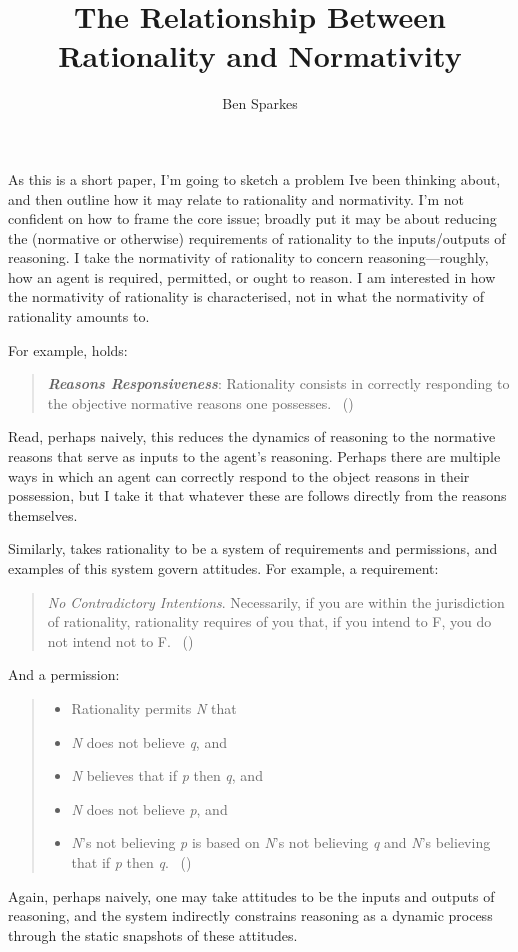 \documentclass[10pt]{article}
\title{The Relationship Between Rationality and Normativity}
\author{Ben Sparkes}
\begin{document}
\maketitle

As this is a short paper, I'm going to sketch a problem Ive been thinking about, and then outline how it may relate to rationality and normativity.
I'm not confident on how to frame the core issue; broadly put it may be about reducing the (normative or otherwise) requirements of rationality to the inputs/outputs of reasoning.
I take the normativity of rationality to concern reasoning---roughly, how an agent is required, permitted, or ought to reason.
I am interested in how the normativity of rationality is characterised, not in what the normativity of rationality amounts to.

For example, \citeauthor{Lord:2017aa} holds:
\begin{quote}
  \emph{\textbf{Reasons Responsiveness}}: Rationality consists in correctly responding to the objective normative reasons one possesses.\nolinebreak
  \mbox{ }\hfill(\citeyear[1121]{Lord:2017aa})
\end{quote}

Read, perhaps naively, this reduces the dynamics of reasoning to the normative reasons that serve as inputs to the agent's reasoning.
Perhaps there are multiple ways in which an agent can correctly respond to the object reasons in their possession, but I take it that whatever these are follows directly from the reasons themselves.

Similarly, \citeauthor{Broome:2013aa} takes rationality to be a system of requirements and permissions, and examples of this system govern attitudes.
For example, a requirement:
\begin{quote}
  \emph{No Contradictory Intentions}. Necessarily, if you are within the jurisdiction of rationality, rationality requires of you that, if you intend to F, you do not intend not to F.\nolinebreak
  \mbox{ }\hfill(\citeyear[136]{Broome:2013aa})
\end{quote}
And a permission:
\begin{quote}
  \begin{itemize}[label=]
  \item Rationality permits \emph{N} that
  \item \emph{N} does not believe \emph{q}, and
  \item \emph{N} believes that if \emph{p} then \emph{q}, and
  \item \emph{N} does not believe \emph{p}, and
  \item \emph{N}'s not believing \emph{p} is based on \emph{N}'s not believing \emph{q} and \emph{N}'s believing that if \emph{p} then \emph{q}.\nolinebreak
  \mbox{ }\hfill(\citeyear[280--281]{Broome:2013aa})
  \end{itemize}
\end{quote}
Again, perhaps naively, one may take attitudes to be the inputs and outputs of reasoning, and the system indirectly constrains reasoning as a dynamic process through the static snapshots of these attitudes.
\end{document}
